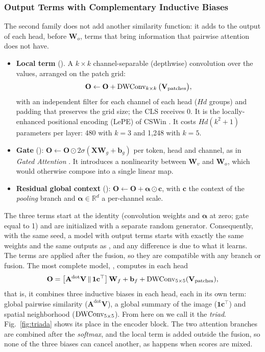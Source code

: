 \subsubsection{Output Terms with Complementary Inductive Biases}
\label{sec:terminos}
The second family does not add another similarity function: it adds to the output of each head, before $\mathbf{W}_o$, terms that bring information that pairwise attention does not have.
\begin{itemize}
  \item \textbf{Local term} (). A $k\times k$ channel-separable (depthwise) convolution over the values, arranged on the patch grid:
  \begin{equation}
    \mathbf{O} \leftarrow \mathbf{O} + \operatorname{DWConv}_{k\times k}\big(\mathbf{V}_{\text{patches}}\big),
    \label{eq:local}
  \end{equation}
  with an independent filter for each channel of each head ($Hd$ groups) and padding that preserves the grid size; the CLS receives 0. It is the locally-enhanced positional encoding (LePE) of CSWin \citep{dong2022cswin}. It costs $Hd(k^2+1)$ parameters per layer: 480 with $k=3$ and 1,248 with $k=5$.
  \item \textbf{Gate} (): $\mathbf{O}\leftarrow\mathbf{O}\odot 2\sigma(\mathbf{X}\mathbf{W}_g + \mathbf{b}_g)$ per token, head and channel, as in \emph{Gated Attention} \citep{qiu2025gated}. It introduces a nonlinearity between $\mathbf{W}_v$ and $\mathbf{W}_o$, which would otherwise compose into a single linear map.
  \item \textbf{Residual global context} (): $\mathbf{O}\leftarrow\mathbf{O} + \bm{\alpha}\odot\mathbf{c}$, with $\mathbf{c}$ the context of the \emph{pooling} branch and $\bm{\alpha}\in\mathbb{R}^{d}$ a per-channel scale.
\end{itemize}
The three terms start at the identity (convolution weights and $\bm{\alpha}$ at zero; gate equal to 1) and are initialized with a separate random generator. Consequently, with the same seed, a model with output terms starts with exactly the same weights and the same outputs as , and any difference is due to what it learns. The terms are applied after the fusion, so they are compatible with any branch or fusion. The most complete model, , computes in each head
\begin{equation}
  \mathbf{O} = \big[\mathbf{A}^{\text{dot}}\mathbf{V}\,\Vert\,\mathbf{1}\mathbf{c}^\top\big]\,\mathbf{W}_f + \mathbf{b}_f + \operatorname{DWConv}_{5\times5}(\mathbf{V}_{\text{patches}}),
  \label{eq:final}
\end{equation}
that is, it combines three inductive biases in each head, each in its own term: global pairwise similarity ($\mathbf{A}^{\text{dot}}\mathbf{V}$), a global summary of the image ($\mathbf{1}\mathbf{c}^\top$) and spatial neighborhood ($\operatorname{DWConv}_{5\times5}$). From here on we call it the \emph{triad}. Fig.~\ref{fig:triada} shows its place in the encoder block. The two attention branches are combined after the \emph{softmax}, and the local term is added outside the fusion, so none of the three biases can cancel another, as happens when scores are mixed.

